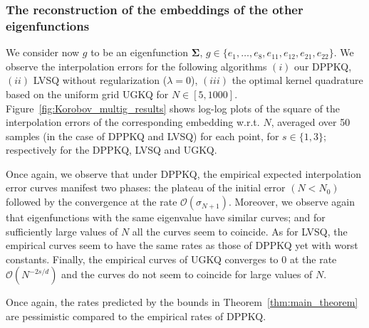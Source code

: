 \documentclass[twoside,11pt]{book}
\numberwithin{theorem}{chapter}
\numberwithin{definition}{chapter}
\numberwithin{proposition}{chapter}
\numberwithin{corollary}{chapter}
\numberwithin{example}{chapter}
\numberwithin{lemma}{chapter}
\numberwithin{assumption}{chapter}
\numberwithin{equation}{chapter}
\numberwithin{figure}{chapter}
\begin{document}
\subsubsection{The reconstruction of the embeddings of the other eigenfunctions}

We consider now $g$ to be an eigenfunction $\bm{\Sigma}$, $g \in \{e_{1},\dots,e_{8},e_{11},e_{12},e_{21},e_{22}\}$. We observe the interpolation errors for the following algorithms $(i)$ our DPPKQ, $(ii)$ LVSQ without regularization ($\lambda =0$), $(iii)$ the optimal kernel quadrature based on the uniform grid UGKQ for $N \in [5,1000]$. Figure~\ref{fig:Korobov_multig_results} shows log-log plots of the square of the interpolation errors of the corresponding embedding  w.r.t. $N$, averaged over 50 samples (in the case of DPPKQ and LVSQ) for each point, for $s \in \{1,3\}$; respectively for the DPPKQ, LVSQ and UGKQ.

Once again, we observe that under DPPKQ, the empirical expected interpolation error  curves manifest two phases: the plateau of the initial error $(N<N_{0})$ followed by the convergence at the rate $\mathcal{O}(\sigma_{N+1})$. Moreover, we observe again that eigenfunctions with the same eigenvalue have similar curves; and for sufficiently large values of $N$ all the curves seem to coincide. As for LVSQ, the empirical curves seem to have the same rates as those of DPPKQ yet with worst constants. Finally, the empirical curves of UGKQ converges to $0$ at the rate $\mathcal{O}(N^{-2s/d})$ and the curves do not seem to coincide for large values of $N$.

Once again, the rates predicted by the bounds in Theorem~\ref{thm:main_theorem} are pessimistic compared to the empirical rates of DPPKQ. 
\end{document}
